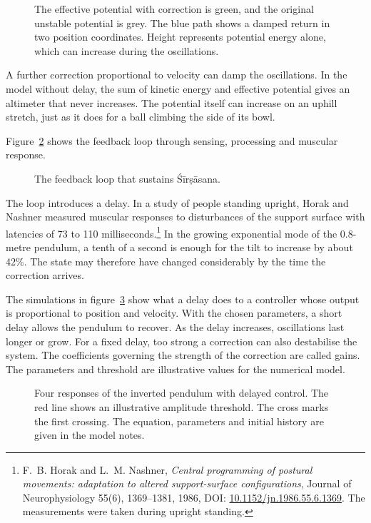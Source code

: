 \begin{figure}
\caption{The effective potential with correction is green, and the original unstable potential is grey. The blue path shows a damped return in two position coordinates. Height represents potential energy alone, which can increase during the oscillations.}
\label{fig:corretto}
\end{figure}

A further correction proportional to velocity can damp the oscillations. In the model without delay, the sum of kinetic energy and effective potential gives an altimeter that never increases. The potential itself can increase on an uphill stretch, just as it does for a ball climbing the side of its bowl.

Figure~\ref{fig:anello} shows the feedback loop through sensing, processing and muscular response.

\begin{figure}
\caption{The feedback loop that sustains Śīrṣāsana.}
\label{fig:anello}
\end{figure}

The loop introduces a delay. In a study of people standing upright, Horak and Nashner measured muscular responses to disturbances of the support surface with latencies of 73 to 110 milliseconds.\footnote{F.~B. Horak and L.~M. Nashner, \emph{Central programming of postural movements: adaptation to altered support-surface configurations}, Journal of Neurophysiology 55(6), 1369--1381, 1986, DOI: \href{https://doi.org/10.1152/jn.1986.55.6.1369}{10.1152/jn.1986.55.6.1369}. The measurements were taken during upright standing.} In the growing exponential mode of the 0.8-metre pendulum, a tenth of a second is enough for the tilt to increase by about 42\%. The state may therefore have changed considerably by the time the correction arrives.

The simulations in figure~\ref{fig:ritardo} show what a delay does to a controller whose output is proportional to position and velocity. With the chosen parameters, a short delay allows the pendulum to recover. As the delay increases, oscillations last longer or grow. For a fixed delay, too strong a correction can also destabilise the system. The coefficients governing the strength of the correction are called gains. The parameters and threshold are illustrative values for the numerical model.

\begin{figure}
\caption{Four responses of the inverted pendulum with delayed control. The red line shows an illustrative amplitude threshold. The cross marks the first crossing. The equation, parameters and initial history are given in the model notes.}
\label{fig:ritardo}
\end{figure}

